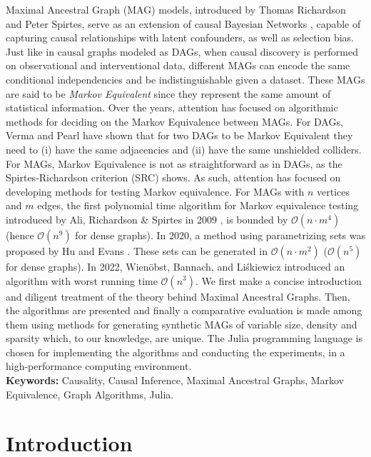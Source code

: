 \documentclass[a4paper]{article}
\begin{document}
	Maximal Ancestral Graph (MAG) models, introduced by Thomas Richardson and Peter Spirtes, serve as an extension of causal Bayesian Networks \cite{pearl2009}, capable of capturing causal relationships with latent confounders, as well as selection bias. Just like in causal graphs modeled as DAGs, when causal discovery is performed on observational and interventional data, different MAGs can encode the same conditional independencies and be indistinguishable given a dataset. These MAGs are said to be \textit{Markov Equivalent} since they represent the same amount of statistical information. Over the years, attention has focused on algorithmic methods for deciding on the Markov Equivalence between MAGs. For DAGs, Verma and Pearl have shown that for two DAGs to be Markov Equivalent they need to (i)  have the same adjacencies and (ii) have the same unshielded colliders. For MAGs, Markov Equivalence is not as straightforward as in DAGs, as the Spirtes-Richardson criterion (SRC) \cite{spirtes1996} shows. As such, attention has focused on developing methods for testing Markov equivalence. For MAGs with $n$ vertices and $m$ edges, the first polynomial time algorithm for Markov equivalence testing introduced by Ali, Richardson \& Spirtes in 2009 \cite{ali2009}, is bounded by $\mathcal{O}(n \cdot m^4)$ (hence $\mathcal{O}(n^9)$ for dense graphs). In 2020, a method using parametrizing sets was proposed by Hu and Evans \cite{hu2020}. These sets can be generated in $\mathcal{O}(n \cdot m^2)$ ($\mathcal{O}(n^5)$ for dense graphs). In 2022, Wienöbst, Bannach, and Liśkiewicz \cite{wienobst2022} introduced an algorithm with worst running time $\mathcal{O}(n^3)$. We first make a concise introduction and diligent treatment of the theory behind Maximal Ancestral Graphs. Then, the algorithms are presented and finally a comparative evaluation is made among them using methods for generating synthetic MAGs of variable size, density and sparsity which, to our knowledge, are unique. The Julia programming language \cite{julia2012} is chosen for implementing the algorithms and conducting the experiments, in a high-performance computing environment. \\
	
\textbf{Keywords:} Causality, Causal Inference, Maximal Ancestral Graphs, Markov Equivalence, Graph Algorithms, Julia.

\pagebreak

\section{Introduction}
\end{document}
